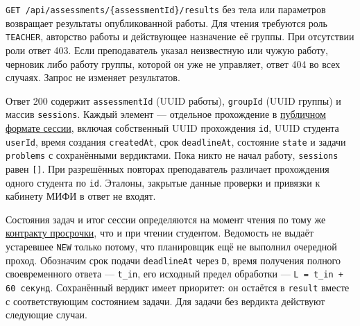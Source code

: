 \documentclass[12pt,a4paper]{article}
\begin{document}
\hypertarget{результаты-контрольного-мероприятия}{}

\texttt{GET /\allowbreak{}api/\allowbreak{}assessments/\allowbreak{}\{assessment\allowbreak{}Id\}/\allowbreak{}results} без тела или параметров возвращает результаты опубликованной работы. Для чтения требуются роль \texttt{TEACHER}, авторство работы и действующее назначение её группы. При отсутствии роли ответ 403. Если преподаватель указал неизвестную или чужую работу, черновик либо работу группы, которой он уже не управляет, ответ 404 во всех случаях. Запрос не изменяет результатов.

Ответ 200 содержит \texttt{assessment\allowbreak{}Id} (UUID работы), \texttt{groupId} (UUID группы) и массив \texttt{sessions}. Каждый элемент --- отдельное прохождение в {\hyperlink{1-создание-сессии}{публичном формате сессии}}, включая собственный UUID прохождения \texttt{id}, UUID студента \texttt{userId}, время создания \texttt{createdAt}, срок \texttt{deadlineAt}, состояние \texttt{state} и задачи \texttt{problems} с сохранёнными вердиктами. Пока никто не начал работу, \texttt{sessions} равен \texttt{{[}{]}}. При разрешённых повторах преподаватель различает прохождения одного студента по \texttt{id}. Эталоны, закрытые данные проверки и привязки к кабинету МИФИ в ответ не входят.

Состояния задач и итог сессии определяются на момент чтения по тому же {\hyperlink{3-чтение-состояния-и-восстановление-после-обрыва-связи}{контракту просрочки}}, что и при чтении студентом. Ведомость не выдаёт устаревшее \texttt{NEW} только потому, что планировщик ещё не выполнил очередной проход. Обозначим срок подачи \texttt{deadlineAt} через \texttt{D}, время получения полного своевременного ответа --- \texttt{t\_in}, его исходный предел обработки --- \texttt{L =\allowbreak{} t\_\allowbreak{}in + 60 секунд}. Сохранённый вердикт имеет приоритет: он остаётся в \texttt{result} вместе с соответствующим состоянием задачи. Для задачи без вердикта действуют следующие случаи.
\end{document}
